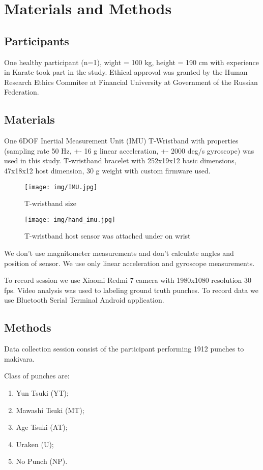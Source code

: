 \documentclass[sport,article,submit,moreauthors,pdftex]{Definitions/mdpi}
\begin{document}
\section{Materials and Methods}
\subsection{Participants}
One healthy participant (n=1), wight = 100 kg, height = 190 cm with experience in Karate took part in the study. Ethical approval was granted by the Human Research Ethics Commitee at Financial University at Government of the Russian Federation.

\subsection{Materials}
One 6DOF Inertial Measurement Unit (IMU) T-Wristband with properties (sampling rate 50 Hz, +- 16 g linear acceleration, +- 2000 deg/s gyroscope) was used in this study. T-wristband bracelet with 252x19x12 basic dimensions, 47x18x12 host dimension, 30 g weight with custom firmware used.

\begin{figure}[H]
\texttt{[image: img/IMU.jpg]}
\caption{T-wristband size}
\end{figure} 

\begin{figure}[H]
\texttt{[image: img/hand\_imu.jpg]}
\caption{T-wristband host sensor was attached under on wrist}
\end{figure} 

We don't use magnitometer measurements and don't calculate angles and position of sensor. We use only linear acceleration and gyroscope measurements.

To record session we use Xiaomi Redmi 7 camera with 1980x1080 resolution 30 fps. Video analysis was used to labeling ground truth punches. To record data we use Bluetooth Serial Terminal Android application.

\subsection{Methods}
Data collection session consist of the participant performing 1912 punches to makivara.

Class of punches are:
\begin{enumerate}
\item	Yun Tsuki (YT); 
\item	Mawashi Tsuki (MT);
\item	Age Tsuki (AT);
\item	Uraken (U);
\item	No Punch (NP).
\end{enumerate}
\end{document}
